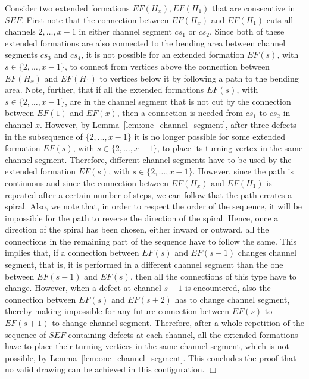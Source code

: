 \documentclass[a4paper,10pt]{llncs}
\renewenvironment{proof}
{{\bf Proof:}}{\hspace*{\fill}$\Box$\par\vspace{2mm}}
\begin{document}
\begin{proof}
Consider two extended formations $EF(H_x), EF(H_1)$ that are consecutive in $SEF$.
First note that the connection between $EF(H_x)$ and $EF(H_1)$ cuts all channels $2, \ldots , x-1$ in either channel segment $cs_1$ or $cs_2$.
Since both of these extended formations are also connected to the bending area between channel segments $cs_3$ and $cs_4$, it is not possible for an extended formation $EF(s)$, with $s \in \{2,\ldots ,x-1\}$, to connect from vertices above the connection between $EF(H_x)$ and $EF(H_1)$ to vertices below it by following a path to the bending area.
Note, further, that if all the extended formations $EF(s)$, with $s \in \{2,\ldots ,x-1\}$, are in the channel
segment that is not cut by the connection between $EF(1)$ and $EF(x)$, then a connection is needed from $cs_1$ to $cs_2$ in channel $x$. However, by Lemma~\ref{lem:one_channel_segment}, after three defects in the subsequence of $\{2,\ldots ,x-1\}$ it is no longer possible for some extended formation $EF(s)$, with $s \in \{2,\ldots ,x-1\}$, to place its turning vertex in the same channel segment. Therefore, different channel segments have to be used by the extended formation $EF(s)$, with $s \in \{2,\ldots ,x-1\}$. However, since the path is continuous and since the connection between $EF(H_x)$ and $EF(H_1)$ is repeated after a certain number of steps, we can follow that the path creates a spiral. Also, we note that, in order to respect the order of the sequence, it will be impossible for the path to reverse the direction of the spiral. Hence, once a direction of the spiral has been chosen, either inward or outward, all the connections in the remaining part of the sequence have to follow the same.
This implies that, if a connection between $EF(s)$ and $EF(s+1)$ changes channel segment, that is, it is performed in a different channel segment than the one between $EF(s-1)$ and $EF(s)$, then all the connections of this type have to change. However, when a defect at channel $s+1$ is encountered, also the connection between $EF(s)$ and $EF(s+2)$ has to change channel segment, thereby making impossible for any future connection between $EF(s)$ to $EF(s+1)$ to change channel segment. Therefore, after a whole repetition of the sequence of $SEF$ containing defects at each channel, all the extended formations have to place their turning vertices in the same channel segment, which is not possible, by Lemma~\ref{lem:one_channel_segment}. This concludes the proof that no valid drawing can be achieved in this configuration.
\end{proof}
\end{document}
